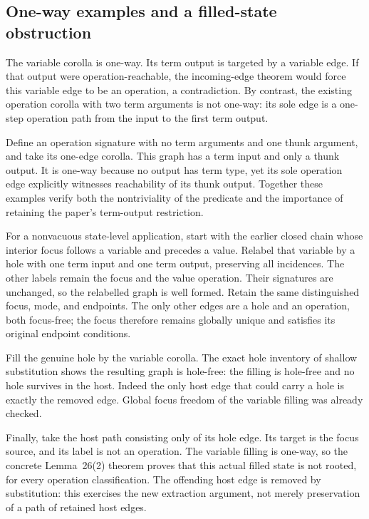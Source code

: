 \subsection{One-way examples and a filled-state obstruction}
The variable corolla is one-way. Its term output is targeted by a variable
edge. If that output were operation-reachable, the incoming-edge theorem
would force this variable edge to be an operation, a contradiction. By
contrast, the existing operation corolla with two term arguments is not
one-way: its sole edge is a one-step operation path from the input to the
first term output.

Define an operation signature with no term arguments and one thunk argument,
and take its one-edge corolla. This graph has a term input and only a thunk
output. It is one-way because no output has term type, yet its sole operation
edge explicitly witnesses reachability of its thunk output. Together these
examples verify both the nontriviality of the predicate and the importance
of retaining the paper's term-output restriction.

For a nonvacuous state-level application, start with the earlier closed chain
whose interior focus follows a variable and precedes a value. Relabel that
variable by a hole with one term input and one term output, preserving all
incidences. The other labels remain the focus and the value operation. Their
signatures are unchanged, so the relabelled graph is well formed. Retain the
same distinguished focus, mode, and endpoints. The only other edges are a
hole and an operation, both focus-free; the focus therefore remains globally
unique and satisfies its original endpoint conditions.

Fill the genuine hole by the variable corolla. The exact hole inventory of
shallow substitution shows the resulting graph is hole-free: the filling is
hole-free and no hole survives in the host. Indeed the only host edge that
could carry a hole is exactly the removed edge. Global focus freedom of the
variable filling was already checked.

Finally, take the host path consisting only of its hole edge. Its target is
the focus source, and its label is not an operation. The variable filling is
one-way, so the concrete Lemma~26(2) theorem proves that this actual filled
state is not rooted, for every operation classification. The offending host
edge is removed by substitution: this exercises the new extraction argument,
not merely preservation of a path of retained host edges.
